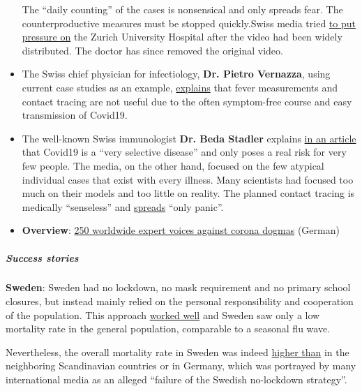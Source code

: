 \begin{itemize}
  The ``daily counting'' of the cases is nonsensical and only spreads
  fear. The counterproductive measures must be stopped quickly.Swiss
  media tried
  \href{https://www.blick.ch/news/schweiz/unispital-distanziert-sich-von-umstrittenen-aussagen-corona-kritiker-feiern-videobotschaft-von-zuercher-oberarzt-id15903859.html}{to
  put pressure on} the Zurich University Hospital after the video had
  been widely distributed. The doctor has since removed the original
  video.
\item
  The Swiss chief physician for infectiology, \textbf{Dr. Pietro
  Vernazza}, using current case studies as an example,
  \href{https://infekt.ch/2020/05/expedition-mit-ueberraschendem-ausgang-ein-epidemiologisches-lehrstueck/}{explains}
  that fever measurements and contact tracing are not useful due to the
  often symptom-free course and easy transmission of Covid19.
\item
  The well-known Swiss immunologist \textbf{Dr. Beda Stadler} explains
  \href{https://www.swissinfo.ch/ita/seconda-ondata-con-lockdown--in-svizzera-no-di-sicuro/45797198}{in
  an article} that Covid19 is a ``very selective disease'' and only
  poses a real risk for very few people. The media, on the other hand,
  focused on the few atypical individual cases that exist with every
  illness. Many scientists had focused too much on their models and too
  little on reality. The planned contact tracing is medically
  ``senseless'' and
  \href{https://www.blick.ch/news/schweiz/behoerden-und-experten-raetseln-wo-ist-das-virus-hin-id15915001.html}{spreads}
  ``only panic''.
\item
  \textbf{Overview}:
  \href{https://www.rubikon.news/artikel/weltweiter-widerstand}{250
  worldwide expert voices against corona dogmas} (German)
\end{itemize}

\hypertarget{success-stories}{%
\subparagraph{\texorpdfstring{\textbf{Success
stories}}{Success stories}}\label{success-stories}}

\textbf{Sweden}: Sweden had no lockdown, no mask requirement and no
primary school closures, but instead mainly relied on the personal
responsibility and cooperation of the population. This approach
\href{https://www.nationalreview.com/2020/05/coronavirus-crisis-sweden-refused-lockdown-other-countries-following/}{worked
well} and Sweden saw only a low mortality rate in the general
population, comparable to a seasonal flu wave.

Nevertheless, the overall mortality rate in Sweden was indeed
\href{https://www.statista.com/statistics/1104709/coronavirus-deaths-worldwide-per-million-inhabitants/}{higher
than} in the neighboring Scandinavian countries or in Germany, which was
portrayed by many international media as an alleged ``failure of the
Swedish no-lockdown strategy''.

